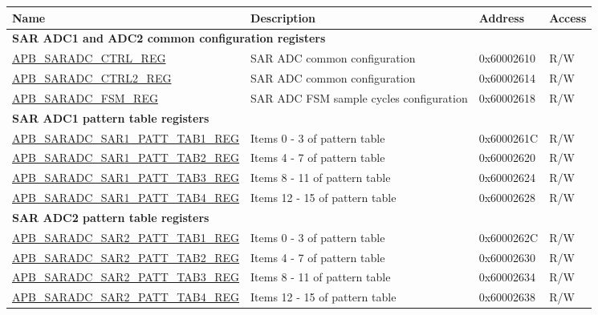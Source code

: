 
\begin{longtable}{ | p{6.0cm} | p{6.5cm} | p{2cm} | p{1cm} | }
\hline\rowcolor{lightgray}
Name & Description &  Address & Access \\ \hline
\multicolumn{4}{|l|}{\textbf{SAR ADC1 and ADC2 common configuration registers}} \\ \hline
\hyperref[regdesc:APBSARADCCTRLREG]{APB\_SARADC\_CTRL\_REG} & SAR ADC common configuration & 0x60002610 & R/W \\ \hline 
\hyperref[regdesc:APBSARADCCTRL2REG]{APB\_SARADC\_CTRL2\_REG} & SAR ADC common configuration & 0x60002614 & R/W \\ \hline
\hyperref[regdesc:APBSARADCFSMREG]{APB\_SARADC\_FSM\_REG} & SAR ADC FSM sample cycles configuration & 0x60002618 & R/W \\ \hline
\multicolumn{4}{|l|}{\textbf{SAR ADC1 pattern table registers}} \\ \hline
\hyperref[regdesc:APBSARADCSAR1PATTTAB1REG]{APB\_SARADC\_SAR1\_PATT\_TAB1\_REG} & Items 0 - 3 of pattern table & 0x6000261C & R/W \\ \hline
\hyperref[regdesc:APBSARADCSAR1PATTTAB2REG]{APB\_SARADC\_SAR1\_PATT\_TAB2\_REG} & Items 4 - 7 of pattern table & 0x60002620 & R/W \\ \hline
\hyperref[regdesc:APBSARADCSAR1PATTTAB3REG]{APB\_SARADC\_SAR1\_PATT\_TAB3\_REG} & Items 8 - 11 of pattern table & 0x60002624 & R/W \\ \hline
\hyperref[regdesc:APBSARADCSAR1PATTTAB4REG]{APB\_SARADC\_SAR1\_PATT\_TAB4\_REG} & Items 12 - 15 of pattern table & 0x60002628 & R/W \\ \hline
\multicolumn{4}{|l|}{\textbf{SAR ADC2 pattern table registers}} \\ \hline
\hyperref[regdesc:APBSARADCSAR2PATTTAB1REG]{APB\_SARADC\_SAR2\_PATT\_TAB1\_REG} & Items 0 - 3 of pattern table & 0x6000262C & R/W \\ \hline
\hyperref[regdesc:APBSARADCSAR2PATTTAB2REG]{APB\_SARADC\_SAR2\_PATT\_TAB2\_REG} & Items 4 - 7 of pattern table & 0x60002630 & R/W \\ \hline
\hyperref[regdesc:APBSARADCSAR2PATTTAB3REG]{APB\_SARADC\_SAR2\_PATT\_TAB3\_REG} & Items 8 - 11 of pattern table & 0x60002634 & R/W \\ \hline
\hyperref[regdesc:APBSARADCSAR2PATTTAB4REG]{APB\_SARADC\_SAR2\_PATT\_TAB4\_REG} & Items 12 - 15 of pattern table & 0x60002638 & R/W \\ \hline
\end{longtable}
